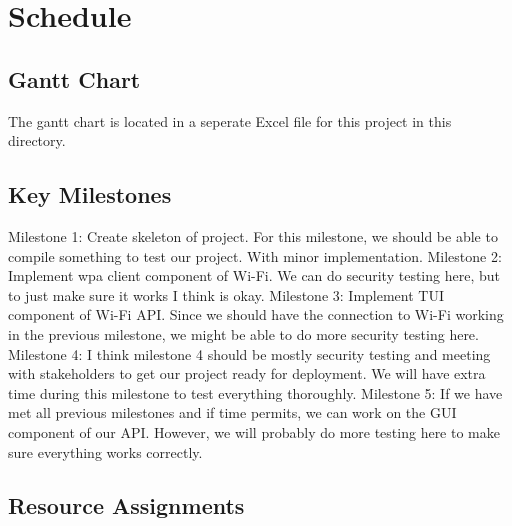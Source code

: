 \section{Schedule}

\subsection{Gantt Chart}

The gantt chart is located in a seperate Excel file for this project in this directory.

\subsection{Key Milestones}

Milestone 1: Create skeleton of project. For this milestone, we should be able to compile something to test our project. With minor implementation. 
Milestone 2: Implement wpa client component of Wi-Fi. We can do security testing here, but to just make sure it works I think is okay. 
Milestone 3: Implement TUI component of Wi-Fi API. Since we should have the connection to Wi-Fi working in the previous milestone, we might be able 
to do more security testing here. 
Milestone 4: I think milestone 4 should be mostly security testing and meeting with stakeholders to get our project ready for deployment. We will have 
extra time during this milestone to test everything thoroughly. 
Milestone 5: If we have met all previous milestones and if time permits, we can work on the GUI component of our API. However, we will probably do more 
testing here to make sure everything works correctly. 

\subsection{Resource Assignments}
%

